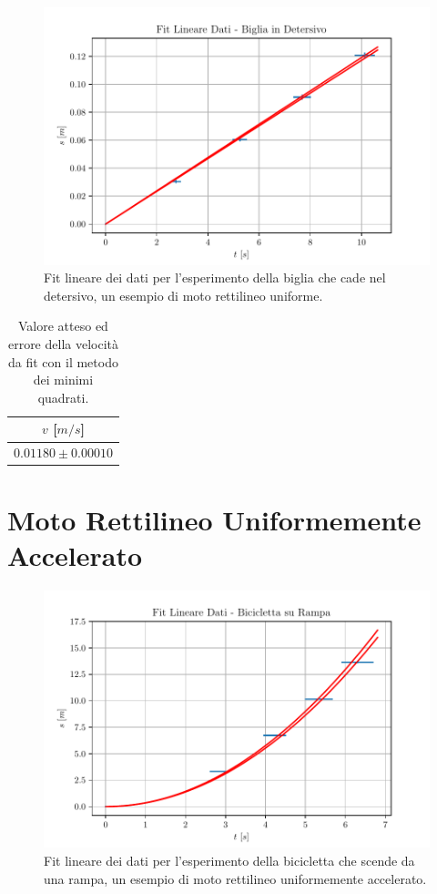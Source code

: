 \documentclass{report} \usepackage[T1]{fontenc} \usepackage[italian]{babel}
\begin{document}
\begin{figure}[H]
\centering
  \includegraphics[width=\textwidth]{fit_marble}
  \caption{Fit lineare dei dati per l'esperimento della biglia che cade nel detersivo,
           un esempio di moto rettilineo uniforme.}
  \label{fig:fit_marble}
\end{figure}

\begin{table}[H]
  \renewcommand{\arraystretch}{1.5}
  \centering
  \begin{tabular}{ | c | }
    \hline
    $v$ [$m/s$] \\
    \hline
    $0.01180\pm0.00010$ \\
    \hline
  \end{tabular}
  \caption{Valore atteso ed errore della velocità da fit con il metodo dei minimi
           quadrati.}
  \label{tab:fit_marble}
\end{table}

\section{Moto Rettilineo Uniformemente Accelerato}

\begin{figure}[H]
  \centering
  \includegraphics[width=\textwidth]{fit_bike}
  \caption{Fit lineare dei dati per l'esperimento della bicicletta che scende da una rampa,
           un esempio di moto rettilineo uniformemente accelerato.}
  \label{fig:fit_bike}
\end{figure}
\end{document}
